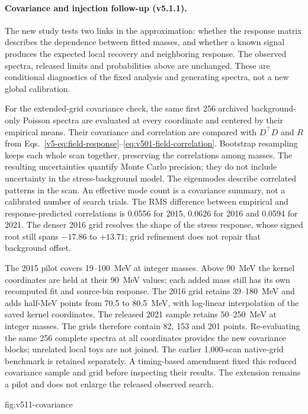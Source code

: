 \clearpage
\paragraph{Covariance and injection follow-up (v5.1.1).}
The new study tests two links in the approximation: whether the response
matrix describes the dependence between fitted masses, and whether a known
signal produces the expected local recovery and neighboring response.
The observed spectra, released limits and probabilities above are unchanged.
These are conditional diagnostics of the fixed analysis and generating
spectra, not a new global calibration.

For the extended-grid covariance check, the same first 256 archived
background-only Poisson spectra are evaluated at every coordinate and
centered by their empirical means. Their covariance
and correlation are compared with $D^\top D$ and $R$ from
Eqs.~\ref{v5-eq:field-response}--\ref{eq:v501-field-correlation}.
Bootstrap resampling keeps each whole scan together, preserving the
correlations among masses. The resulting uncertainties quantify Monte Carlo
precision; they do not include uncertainty in the stress-background model.
The eigenmodes describe correlated patterns in the scan. An effective
mode count is a covariance summary, not a calibrated number of search trials.
The RMS difference between empirical and response-predicted correlations
is 0.0556 for 2015, 0.0626 for 2016 and 0.0594 for 2021. The denser
2016 grid resolves the shape of the stress response, whose signed root
still spans $-17.86$ to $+13.71$; grid refinement does not repair that
background offset.

The 2015 pilot covers 19--100~MeV at integer masses. Above 90~MeV the
kernel coordinates are held at their 90~MeV values; each added mass still
has its own recomputed fit and source-bin response. The 2016 grid retains
39--180~MeV and adds half-MeV points from 70.5 to 80.5~MeV, with log-linear
interpolation of the saved kernel coordinates. The released 2021 sample
retains 50--250~MeV at integer masses. The grids therefore contain
82, 153 and 201 points. Re-evaluating the same 256 complete spectra at
all coordinates provides the new covariance blocks; unrelated local toys
are not joined. The earlier 1,000-scan native-grid benchmark is retained
separately. A timing-based amendment fixed this reduced covariance sample
and grid before inspecting their results. The extension remains a pilot
and does not enlarge the released observed search.

{fig:v511-covariance}
\FloatBarrier

